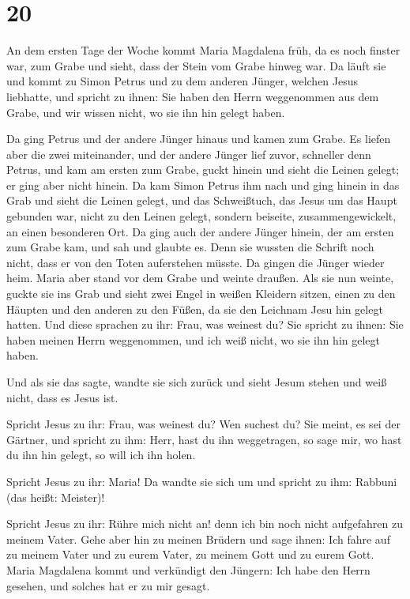\hypertarget{section-19}{%
\section{20}\label{section-19}}

 An dem ersten Tage der Woche kommt Maria Magdalena früh,
da es noch finster war, zum Grabe und sieht, dass der Stein vom Grabe
hinweg war.  Da läuft sie und kommt zu Simon Petrus und zu
dem anderen Jünger, welchen Jesus liebhatte, und spricht zu ihnen: Sie
haben den Herrn weggenommen aus dem Grabe, und wir wissen nicht, wo sie
ihn hin gelegt haben.

 Da ging Petrus und der andere Jünger hinaus und kamen zum
Grabe.  Es liefen aber die zwei miteinander, und der
andere Jünger lief zuvor, schneller denn Petrus, und kam am ersten zum
Grabe,  guckt hinein und sieht die Leinen gelegt; er ging
aber nicht hinein.  Da kam Simon Petrus ihm nach und ging
hinein in das Grab und sieht die Leinen gelegt,  und das
Schweißtuch, das Jesus um das Haupt gebunden war, nicht zu den Leinen
gelegt, sondern beiseite, zusammengewickelt, an einen besonderen Ort.
 Da ging auch der andere Jünger hinein, der am ersten zum
Grabe kam, und sah und glaubte es.  Denn sie wussten die
Schrift noch nicht, dass er von den Toten auferstehen müsste.
 Da gingen die Jünger wieder heim.  Maria
aber stand vor dem Grabe und weinte draußen. Als sie nun weinte, guckte
sie ins Grab  und sieht zwei Engel in weißen Kleidern
sitzen, einen zu den Häupten und den anderen zu den Füßen, da sie den
Leichnam Jesu hin gelegt hatten.  Und diese sprachen zu
ihr: Frau, was weinest du? Sie spricht zu ihnen: Sie haben meinen Herrn
weggenommen, und ich weiß nicht, wo sie ihn hin gelegt haben.

 Und als sie das sagte, wandte sie sich zurück und sieht
Jesum stehen und weiß nicht, dass es Jesus ist.

 Spricht Jesus zu ihr: Frau, was weinest du? Wen suchest
du? Sie meint, es sei der Gärtner, und spricht zu ihm: Herr, hast du ihn
weggetragen, so sage mir, wo hast du ihn hin gelegt, so will ich ihn
holen.

 Spricht Jesus zu ihr: Maria! Da wandte sie sich um und
spricht zu ihm: Rabbuni (das heißt: Meister)!

 Spricht Jesus zu ihr: Rühre mich nicht an! denn ich bin
noch nicht aufgefahren zu meinem Vater. Gehe aber hin zu meinen Brüdern
und sage ihnen: Ich fahre auf zu meinem Vater und zu eurem Vater, zu
meinem Gott und zu eurem Gott.  Maria Magdalena kommt und
verkündigt den Jüngern: Ich habe den Herrn gesehen, und solches hat er
zu mir gesagt.

